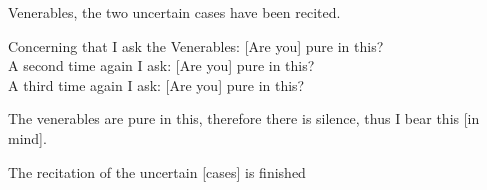 \medskip

\begin{center}
Venerables, the two uncertain cases have been recited.

\smallskip

Concerning that I ask the Venerables: [Are you] pure in this?\\
A second time again I ask: [Are you] pure in this?\\
A third time again I ask: [Are you] pure in this?

\smallskip

The venerables are pure in this, therefore there is silence, thus I bear this [in mind].
\end{center}

\begin{outro}
  The recitation of the uncertain [cases] is finished
\end{outro}

\clearpage
